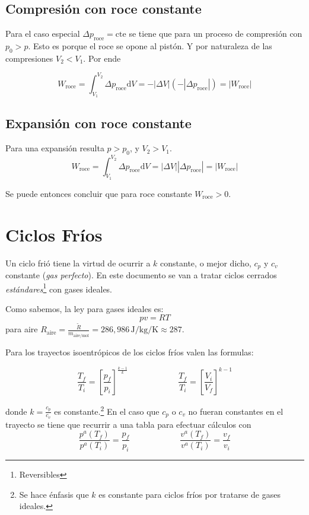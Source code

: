 \documentclass{article}
\newcommand{\ctegas}{k}
\newcommand{\cte}{\textrm{cte}}
\newcommand{\inicial}{i}
\newcommand{\final}{f}
\newcommand{\di}{\textrm{d}}
\begin{document}
\subsection{Compresión con roce constante}
Para el caso especial $\Delta p_{\textrm{roce}}=\cte$ se tiene que para un proceso de compresión con $p_0>p$. Esto es porque el roce se opone al pistón. Y por naturaleza de las compresiones $V_2<V_1$. Por ende

\[
W_{\textrm{roce}} = \int_{V_1}^{V_2}\Delta p_{\textrm{roce}} \di V = -|\Delta V| \left(-|\Delta p_{\textrm{roce}}|\right) = \left|W_{\textrm{roce}}\right| 
\]


\subsection{Expansión con roce constante}
Para una expansión resulta $p>p_0$, y $V_2>V_1$.
\[
W_{\textrm{roce}} = \int_{V_1}^{V_2}\Delta p_{\textrm{roce}} \di V = |\Delta V| |\Delta p_{\textrm{roce}}| = \left|W_{\textrm{roce}}\right|
\]

Se puede entonces concluir que para roce constante $W_{\textrm{roce}}>0$. 

\section{Ciclos Fríos}
Un ciclo frió tiene la virtud de ocurrir a $\ctegas$ constante, o mejor dicho, $c_p$ y $c_v$ constante (\textit{gas perfecto}). En este documento se van a tratar ciclos cerrados \textit{estándares}\footnote{Reversibles} con gases ideales. 

Como sabemos, la ley para gases ideales es:
\begin{equation}
pv=RT
\end{equation}
para aire  $R_{\textrm{aire}}=\frac{\tilde{R}}{m_{\textrm{aire/mol}}}=286,986\, \si{\joule \per \kilogram \per \kelvin}\approx 287$.


Para los trayectos isoentrópicos de los ciclos fríos valen las formulas:

\begin{equation}\label{eq:relacionisoentrop}
\frac{T_\final}{T_\inicial} = \left[ \frac{p_\final}{p_\inicial}\right]^{\frac{\ctegas-1}{\ctegas}} \qquad\qquad\qquad \frac{T_\final}{T_\inicial} = \left[ \frac{V_\inicial}{V_\final} \right]^{\ctegas-1}\!\!
\end{equation}

donde $\ctegas=\frac{c_p}{c_v}$ es constante.\footnote{Se hace énfasis que $\ctegas$ es constante para ciclos fríos por tratarse de gases ideales.} En el caso que $c_p$ o $c_v$ no fueran constantes en el trayecto se tiene que recurrir a una tabla para efectuar cálculos con
\[
\frac{p^a(T_\final)}{p^a(T_\inicial)}=\frac{p_\final}{p_\inicial}\qquad \qquad \qquad \frac{v^a(T_\final)}{v^a(T_\inicial)}=\frac{v_\final}{v_\inicial}
\]
\end{document}
